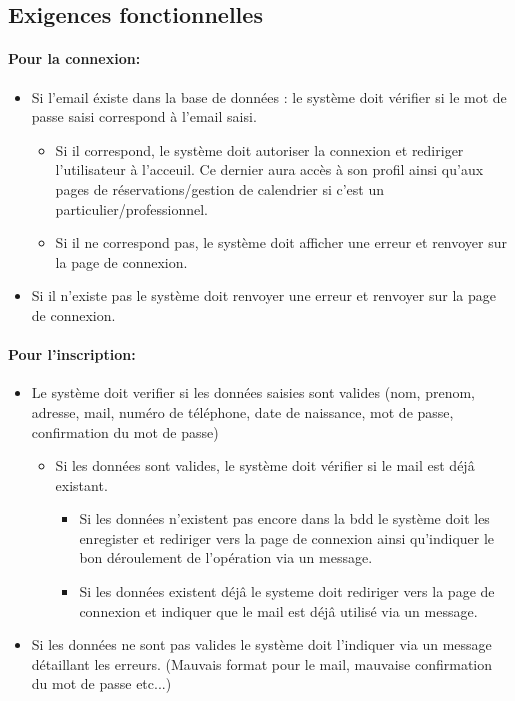 \documentclass{article}
\begin{document}
\subsection{Exigences fonctionnelles}
\paragraph{Pour la connexion: }


\begin{itemize}
\item Si l'email éxiste dans la base de données : 
	le système doit vérifier si le mot de passe saisi
	correspond à l'email saisi.
		\begin{itemize}
		\item Si il correspond, le système doit autoriser la connexion et
			rediriger l'utilisateur à l'acceuil. Ce dernier aura accès à son
			profil ainsi qu'aux pages de réservations/gestion de calendrier
			si c'est un particulier/professionnel.
		\item Si il ne correspond pas, le système doit afficher une erreur
			et renvoyer sur la page de connexion.
		\end{itemize}
\item Si il n'existe pas le système doit renvoyer une erreur
	et renvoyer sur la page de connexion.
\end{itemize}


\paragraph{Pour l'inscription: }
\begin{itemize}
\item Le système doit verifier si les données saisies sont valides (nom, prenom, adresse, mail, numéro de téléphone, date de naissance,
 mot de passe, confirmation du mot de passe)
	\begin{itemize}
	\item Si les données sont valides, le système doit vérifier si le mail
		est déjâ existant.
		\begin{itemize}
		\item Si les données n'existent pas encore dans la bdd le système
			doit les enregister et rediriger vers la page de connexion
			ainsi qu'indiquer le bon déroulement de l'opération via un message.
		\item Si les données existent déjâ le systeme doit rediriger vers
			la page de connexion et indiquer que le mail est déjâ utilisé
			via un message.
		\end{itemize}
	\end{itemize}
\item Si les données ne sont pas valides le système doit l'indiquer
	via un message détaillant les erreurs. (Mauvais format pour le mail, mauvaise confirmation du mot de passe etc...)
\end{itemize}
\end{document}
